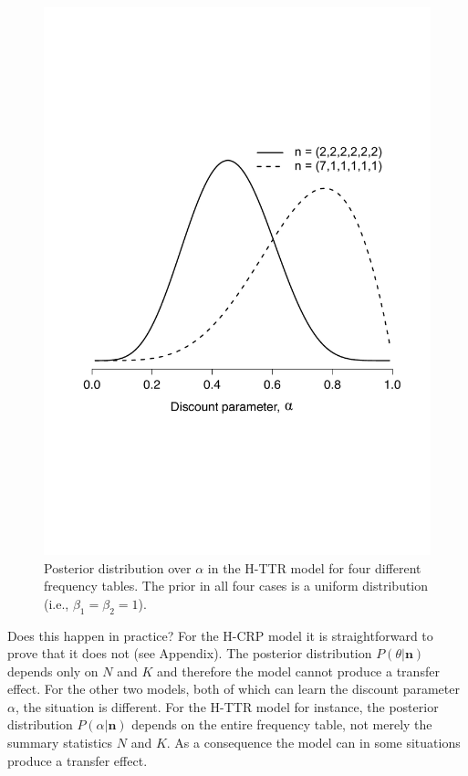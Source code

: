 \documentclass[doc]{apa6}
\begin{document}
\begin{figure}[p]
\begin{center}
\includegraphics[scale=.35]{posteriorFig3b.pdf}
\caption{Posterior distribution over $\alpha$ in the H-TTR model for four different frequency tables. The prior in all four cases is a uniform distribution (i.e., $\beta_1 = \beta_2 = 1$).}
\label{fig:posteriors}
\end{center}
\end{figure}


Does this happen in practice? For the H-CRP model it is straightforward to prove that it does not (see Appendix). The posterior distribution $P(\theta |\bm{n})$ depends only on $N$ and $K$ and therefore the model cannot produce a transfer effect. For the other two models, both of which can learn the discount parameter $\alpha$, the situation is different. For the H-TTR model for instance, the posterior distribution $P(\alpha | \bm{n})$ depends on the entire frequency table, not merely the summary statistics $N$ and $K$. As a consequence the model can in some situations produce a transfer effect.
\end{document}
